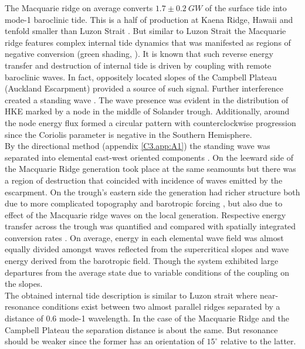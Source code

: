 \documentclass[12pt]{article}
\begin{document}
The Macquarie ridge on average converts $1.7 \pm 0.2~GW$ of the surface tide into mode-1 
baroclinic tide. This is a half of production at Kaena Ridge, Hawaii \citep{carter2008energetics} 
and tenfold smaller than Luzon Strait \citep{alford2011energy, kerry2014impact}. But similar to 
Luzon Strait the Macquarie ridge features complex internal tide dynamics that was manifested as 
regions of negative conversion (green shading, ). It is known 
\citep{Kelly2010a} that such reverse energy transfer and destruction of internal tide is driven by 
coupling with remote baroclinic waves. In fact, oppositely located slopes of the Campbell Plateau 
(Auckland Escarpment) provided a source of such signal. Further interference created a standing 
wave . The wave presence was evident in the 
distribution of 
HKE marked by a 
node in the middle of Solander trough. Additionally, around the node energy flux formed a circular 
pattern  with counterclockwise progression since the Coriolis parameter 
is 
negative in the Southern Hemisphere.\\

By the directional method (appendix \ref{C3.app:A1}) the standing wave was separated 
into elemental east-west oriented components . On the leeward side 
of the Macquarie Ridge generation took place at the same seamounts but there was a region of 
destruction that coincided with incidence of waves emitted by the escarpment. On the trough's 
eastern side the generation had richer structure both due to more complicated topography and 
barotropic forcing , but also due to effect of the Macquarie ridge waves on 
the local generation. Respective energy transfer across the trough was quantified and compared with 
spatially integrated conversion rates . On average, energy in each 
elemental wave field was almost equally divided amongst waves reflected from the supercritical 
slopes and wave energy derived from the barotropic field. Though the system exhibited large 
departures from the average state due to variable conditions of the coupling on the slopes.\\

The obtained internal tide description is similar to Luzon strait where near-resonance conditions 
exist 
between two almost parallel ridges \citep{buijsman2012double, buijsman2014three} separated by a 
distance of 0.6 mode-1 wavelength. In the case of the Macquarie Ridge and the Campbell Plateau the separation distance is about the same. But resonance should be weaker since the former has an orientation of $15^{\circ}$ relative to the 
latter.\\
\end{document}
